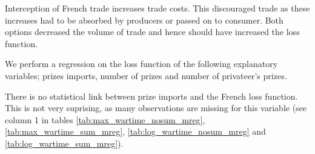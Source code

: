 \documentclass[12pt,a4paper,notitlepage,english]{article}
\begin{document}

Interception of French trade increases trade costs.
This discouraged trade as these increases had to be absorbed by producers or passed on to consumer.
Both options decreased the volume of trade and hence should have increased the loss function.



We perform a regression on the loss function of the following explanatory variables; prizes imports, number of prizes and number of privateer's prizes. 

There is no statistical link between prize imports and the French loss function. This is not very suprising, as many observations are missing for this variable (see column 1 in tables \ref{tab:max_wartime_nosum_mreg},  \ref{tab:max_wartime_sum_mreg}, \ref{tab:log_wartime_nosum_mreg} and   \ref{tab:log_wartime_sum_mreg}).



\end{document}
